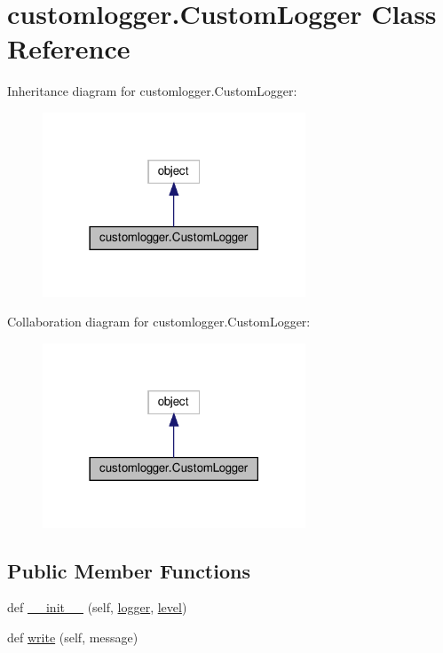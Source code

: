 \hypertarget{classcustomlogger_1_1CustomLogger}{}\section{customlogger.\+Custom\+Logger Class Reference}
\label{classcustomlogger_1_1CustomLogger}


Inheritance diagram for customlogger.\+Custom\+Logger\+:
\nopagebreak
\begin{figure}[H]
\begin{center}
\leavevmode
\includegraphics[width=222pt]{classcustomlogger_1_1CustomLogger__inherit__graph}
\end{center}
\end{figure}


Collaboration diagram for customlogger.\+Custom\+Logger\+:
\nopagebreak
\begin{figure}[H]
\begin{center}
\leavevmode
\includegraphics[width=222pt]{classcustomlogger_1_1CustomLogger__coll__graph}
\end{center}
\end{figure}
\subsection*{Public Member Functions}
\begin{DoxyCompactItemize}
\item 
def \hyperlink{classcustomlogger_1_1CustomLogger_ad0fa3a11a371fa6b445768b0b9e8fe03}{\+\_\+\+\_\+init\+\_\+\+\_\+} (self, \hyperlink{classcustomlogger_1_1CustomLogger_a800aa033e5fd2a8fc1e108a6046fd7fe}{logger}, \hyperlink{classcustomlogger_1_1CustomLogger_aa1e8b5f7e7dd6b9a1c2db6e66f3c3da6}{level})
\item 
def \hyperlink{classcustomlogger_1_1CustomLogger_ae4e52add9e53df464b370744233b16f7}{write} (self, message)
\end{DoxyCompactItemize}
